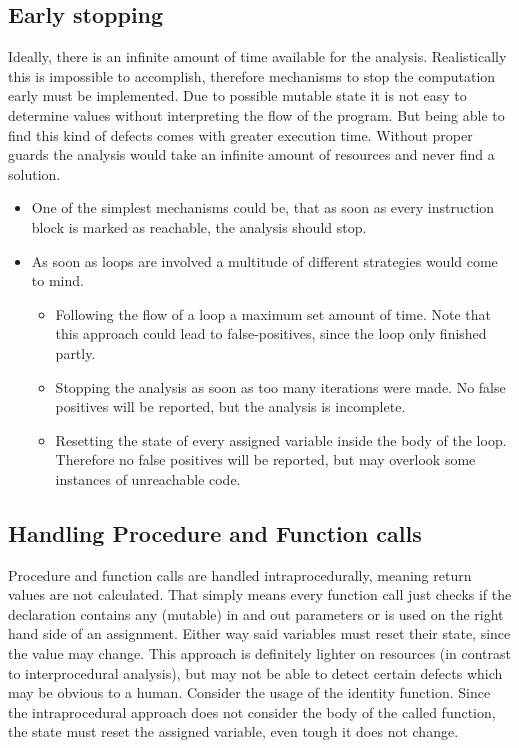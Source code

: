 \subsection{Early stopping}
\label{sub:early stopping}
Ideally, there is an infinite amount of time available for the analysis. Realistically this is impossible to accomplish, therefore mechanisms to stop the computation early must be implemented.
Due to possible mutable state it is not easy to determine values without interpreting the flow of the program. 
But being able to find this kind of defects comes with greater execution time. Without proper guards the analysis would take an infinite amount of resources and never find a solution.
\begin{itemize}
	\item One of the simplest mechanisms could be, that as soon as every instruction block is marked as reachable, the analysis should stop.
	\item As soon as loops are involved a multitude of different strategies would come to mind. 
	\begin{itemize}
		\item Following the flow of a loop a maximum set amount of time. Note that this approach could lead to false-positives, since the loop only finished partly. 
		\item Stopping the analysis as soon as too many iterations were made. No false positives will be reported, but the analysis is incomplete.
		\item Resetting the state of every assigned variable inside the body of the loop. Therefore no false positives will be reported, but may overlook some instances of unreachable code.
	\end{itemize}
\end{itemize}

\subsection{Handling Procedure and Function calls}
\label{sub:handling procedure and function calls}
Procedure and function calls are handled intraprocedurally, meaning return values are not calculated. That simply means every function call just checks if the declaration contains any (mutable) in and out parameters or is used on the right hand side of an assignment.
Either way said variables must reset their state, since the value may change. 
This approach is definitely lighter on resources (in contrast to interprocedural analysis), but may not be able to detect certain defects which may be obvious to a human. Consider the usage of the identity function. Since the intraprocedural approach does not consider the body of the called function, the state must reset the assigned variable, even tough it does not change.

